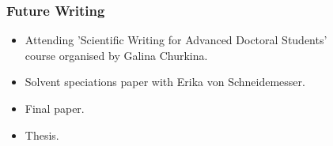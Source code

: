 \begin{frame}
    \frametitle{Future Writing}
    \vspace{-3mm}
    \begin{itemize}
        \item Attending 'Scientific Writing for Advanced Doctoral Students' \\ course organised by Galina Churkina. \vspace{4mm}
        \item Solvent speciations paper with Erika von Schneidemesser. \vspace{4mm}
        \item Final paper. \vspace{4mm}
        \item Thesis.
    \end{itemize}
\end{frame}
